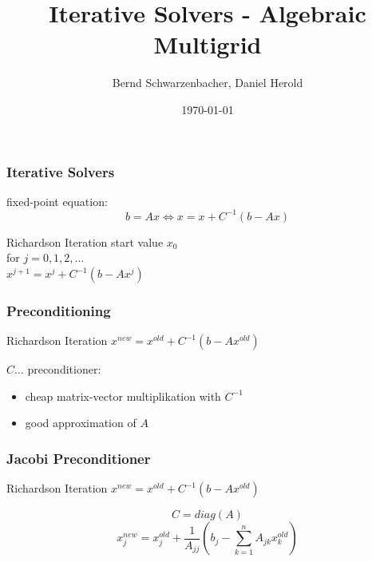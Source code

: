\documentclass{beamer}
\title[Algebraic Multigrid]{Iterative Solvers - Algebraic Multigrid} %
\author{Bernd Schwarzenbacher, Daniel Herold} %
\institute[TU Wien] %
{Technical University of Vienna \\ %
\medskip
}
\date{\today} %
\begin{document}
\begin{frame}
\titlepage %
\end{frame}




\begin{frame}
\frametitle{Iterative Solvers}
fixed-point equation:
$$b = Ax \iff x = x + C^{-1} (b-Ax)$$
\begin{block}{Richardson Iteration}
start value $x_{0}$ \\
for $j = 0, 1, 2, \dots$ \\
\quad $x^{j+1} = x^{j} + C^{-1} (b - Ax^{j})$
\end{block}
\end{frame}

\begin{frame}
\frametitle{Preconditioning}
\begin{block}{Richardson Iteration}
$x^{new} = x^{old} + C^{-1} (b - Ax^{old})$
\end{block}
$C \dots$ preconditioner:
\begin{itemize}
  \item cheap matrix-vector multiplikation with $C^{-1}$
  \item good approximation of $A$
\end{itemize}
\end{frame}

\begin{frame}
\frametitle{Jacobi Preconditioner}
\begin{block}{Richardson Iteration}
$x^{new} = x^{old} + C^{-1} (b - Ax^{old})$
\end{block}
$$C = diag(A)$$
$$x_j^{new} = x_j^{old} + \frac{1}{A_{jj}} \left(b_{j} -
\sum_{k=1}^{n} A_{jk} x_k^{old}\right)$$
\end{frame}
\end{document}
